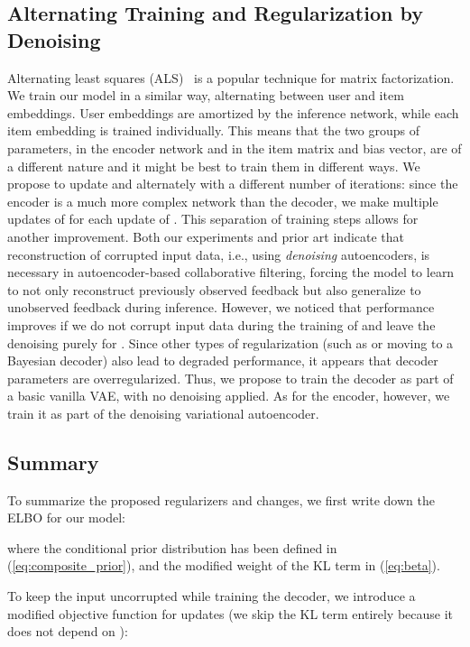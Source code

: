 \documentclass[sigconf,authorversion]{acmart}
\begin{document}
\subsection{Alternating Training and Regularization by Denoising}\label{sec:als}

Alternating least squares (ALS)~\cite{bell2007scalable} is a popular technique for matrix factorization. We train our model in a similar way, alternating between user and item embeddings. User embeddings are amortized by the inference network, while each item embedding is trained individually. This means that the two groups of parameters,  in the encoder network and  in the item matrix and bias vector, are of a different nature and it might be best to train them in different ways. We propose to update  and  alternately with a different number of iterations: since the encoder is a much more complex network than the decoder, we make multiple updates of  for each update of .
This separation of training steps allows for another improvement. Both our experiments and prior art indicate that reconstruction of corrupted input data, i.e., using \emph{denoising} autoencoders, is necessary in autoencoder-based collaborative filtering, forcing the model to learn to not only reconstruct previously observed feedback but also generalize to unobserved feedback during inference. However, we noticed that performance improves if we do not corrupt input data during the training of  and leave the denoising purely for .
Since other types of regularization (such as  or moving to a Bayesian decoder) also lead to degraded performance, it appears that decoder parameters are overregularized. Thus, we propose to train the decoder as part of a basic vanilla VAE, with no denoising applied. As for the encoder, however, we train it as part of the denoising variational autoencoder.

\subsection{Summary}

To summarize the proposed regularizers and changes, we first write down the ELBO for our model: 

where the conditional prior distribution  has been defined in (\ref{eq:composite_prior}), and the modified weight  of the KL term in (\ref{eq:beta}).

To keep the input uncorrupted while training the decoder, we introduce a modified objective function for  updates (we skip the KL term entirely because it does not depend on ):
\end{document}
